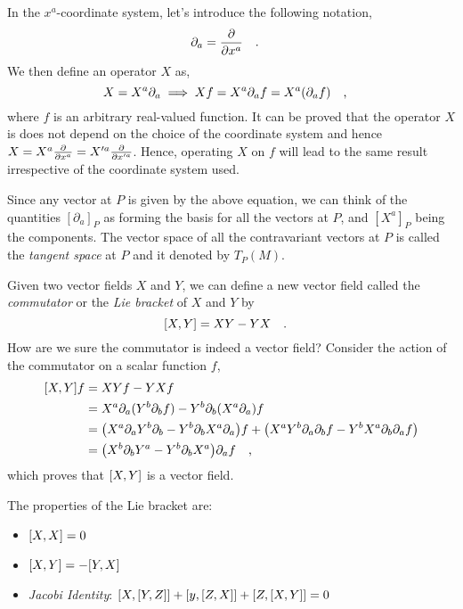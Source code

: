 \documentclass[a4paper,11pt]{article}
\begin{document}
In the $ x^a $-coordinate system, let's introduce the following notation,
\begin{equation}\label{key}
\partial_a = \pdv{x^a} \qq{.}
\end{equation}
We then define an operator $ X $ as,
\begin{equation}\label{key}
X = X^a \partial_a \implies Xf = X^a \partial_a f = X^a (\partial_a f) \qq{,}
\end{equation}
where $ f $ is an arbitrary real-valued function. It can be proved that the operator $ X $ is does not depend on the choice of the coordinate system and hence $ X = X^a \pdv{x^a} =X'^a \pdv{x'^a}  $. Hence, operating $ X $ on $ f $ will lead to the same result irrespective of the coordinate system used.

Since any vector at $ P $ is given by the above equation, we can think of the quantities $ [\partial_a]_P $ as forming the basis for all the vectors at $ P $, and $ [X^a]_P $ being the components. The vector space of all the contravariant vectors at $ P $ is called the \textit{tangent space} at $ P $ and it denoted by $T_P(M)$.

Given two vector fields $ X $ and $ Y $, we can define a new vector field called the \textit{commutator} or the \textit{Lie bracket} of $ X $ and $ Y $ by
\begin{equation}\label{key}
\qty[X, Y] = XY - YX \qq{.}
\end{equation}
How are we sure the commutator is indeed a vector field? Consider the action of the commutator on a scalar function $ f $,
\begin{align*}
	\qty[X, Y] f &= XYf - YXf \\
	&= X^a \partial_a ( Y^b \partial_b f  ) - Y^b \partial_b (X^a \partial_a ) f \\
	&=\qty(X^a \partial_a Y^b \partial_b    - Y^b \partial_b X^a \partial_a ) f  + \qty(X^a Y^b \partial_a  \partial_b f - Y^b X^a \partial_b \partial_a f) \\
	& = \qty(X^b \partial_b Y^a     - Y^b \partial_b X^a ) \partial_a f \qq{,} 
\end{align*}
which proves that $ \qty[X,Y] $ is a vector field.

The properties of the Lie bracket are:
\begin{itemize}
	\item  $ \qty[X,X] = 0 $
	\item $ \comm{X}{Y} = - \comm{Y}{X} $
	\item \textit{Jacobi Identity}: $ \comm{X}{\comm{Y}{Z}} + \comm{y}{\comm{Z}{X}} + \comm{Z}{\comm{X}{Y}} = 0 $
\end{itemize}
\end{document}
